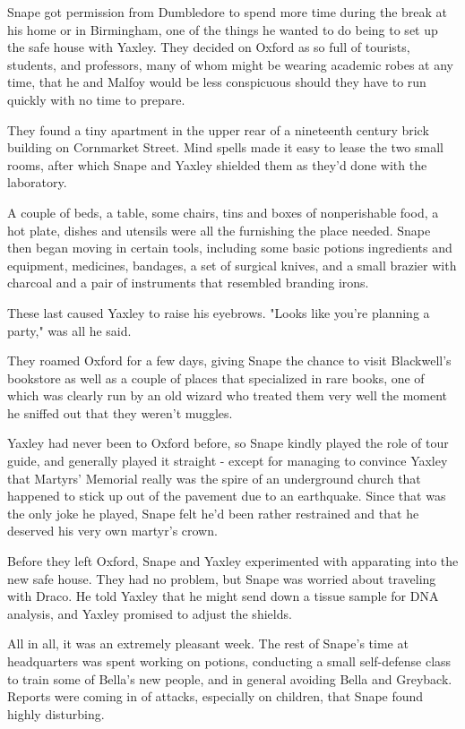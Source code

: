 Snape got permission from Dumbledore to spend more time during the break at his home or in Birmingham, one of the things he wanted to do being to set up the safe house with Yaxley. They decided on Oxford as so full of tourists, students, and professors, many of whom might be wearing academic robes at any time, that he and Malfoy would be less conspicuous should they have to run quickly with no time to prepare.

They found a tiny apartment in the upper rear of a nineteenth century brick building on Cornmarket Street. Mind spells made it easy to lease the two small rooms, after which Snape and Yaxley shielded them as they'd done with the laboratory.

A couple of beds, a table, some chairs, tins and boxes of nonperishable food, a hot plate, dishes and utensils were all the furnishing the place needed. Snape then began moving in certain tools, including some basic potions ingredients and equipment, medicines, bandages, a set of surgical knives, and a small brazier with charcoal and a pair of instruments that resembled branding irons.

These last caused Yaxley to raise his eyebrows. "Looks like you're planning a party," was all he said.

They roamed Oxford for a few days, giving Snape the chance to visit Blackwell's bookstore as well as a couple of places that specialized in rare books, one of which was clearly run by an old wizard who treated them very well the moment he sniffed out that they weren't muggles.

Yaxley had never been to Oxford before, so Snape kindly played the role of tour guide, and generally played it straight - except for managing to convince Yaxley that Martyrs' Memorial really was the spire of an underground church that happened to stick up out of the pavement due to an earthquake. Since that was the only joke he played, Snape felt he'd been rather restrained and that he deserved his very own martyr's crown.

Before they left Oxford, Snape and Yaxley experimented with apparating into the new safe house. They had no problem, but Snape was worried about traveling with Draco. He told Yaxley that he might send down a tissue sample for DNA analysis, and Yaxley promised to adjust the shields.

All in all, it was an extremely pleasant week. The rest of Snape's time at headquarters was spent working on potions, conducting a small self-defense class to train some of Bella's new people, and in general avoiding Bella and Greyback. Reports were coming in of attacks, especially on children, that Snape found highly disturbing.

